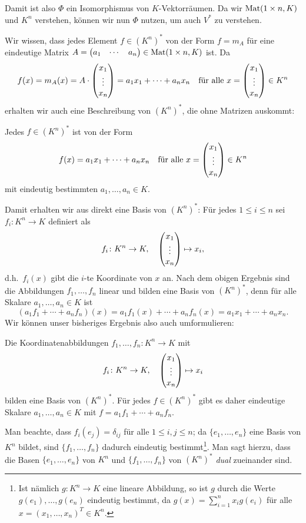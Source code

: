 \documentclass[a4paper,10pt]{article}
\begin{document}
Damit ist also $\Phi$ ein Isomorphismus von $K$-Vektorräumen. Da wir $\mathrm{Mat}(1 \times n, K)$ und $K^n$ verstehen, können wir nun $\Phi$ nutzen, um auch $V^*$ zu verstehen.

Wir wissen, dass jedes Element $f \in (K^n)^*$ von der Form $f = m_A$ für eine eindeutige Matrix $A = \begin{pmatrix} a_1 & \cdots & a_n \end{pmatrix} \in \mathrm{Mat}(1 \times n, K)$ ist. Da
\[
 f(x)
 = m_A(x)
 = A \cdot \begin{pmatrix} x_1 \\ \vdots \\ x_n \end{pmatrix}
 = a_1 x_1 + \dotsb + a_n x_n
 \quad
 \text{für alle $x = \begin{pmatrix} x_1 \\ \vdots \\ x_n \end{pmatrix} \in K^n$}
\]
erhalten wir auch eine Beschreibung von $(K^n)^*$, die ohne Matrizen auskommt:


\begin{shaded}
 Jedes $f \in (K^n)^*$ ist von der Form
 \[
  f(x) = a_1 x_1 + \dotsb + a_n x_n
  \quad
  \text{für alle $x = \begin{pmatrix} x_1 \\ \vdots \\ x_n \end{pmatrix} \in K^n$}
 \]
 mit eindeutig bestimmten $a_1, \dotsc, a_n \in K$.
\end{shaded}

Damit erhalten wir aus direkt eine Basis von $(K^n)^*$: Für jedes $1 \leq i \leq n$ sei $f_i \colon K^n \to K$ definiert als
\[
 f_i \colon K^n \to K, \quad \begin{pmatrix} x_1 \\ \vdots \\ x_n \end{pmatrix} \mapsto x_i,
\]
d.h.\ $f_i(x)$ gibt die $i$-te Koordinate von $x$ an. Nach dem obigen Ergebnis sind die Abbildungen $f_1, \dotsc, f_n$ linear und bilden eine Basis von $(K^n)^*$, denn für alle Skalare $a_1, \dotsc, a_n \in K$ ist
\[
 (a_1 f_1 + \dotsb + a_n f_n)(x)
 = a_1 f_1(x) + \dotsb + a_n f_n(x)
 = a_1 x_1 + \dotsb + a_n x_n.
\]
Wir können unser bisheriges Ergebnis also auch umformulieren:

\begin{shaded}
 Die Koordinatenabbildungen $f_1, \dotsc, f_n \colon K^n \to K$ mit
 \[
  f_i \colon K^n \to K, \quad \begin{pmatrix} x_1 \\ \vdots \\ x_n \end{pmatrix} \mapsto x_i
 \]
 bilden eine Basis von $(K^n)^*$. Für jedes $f \in (K^n)^*$ gibt es daher eindeutige Skalare $a_1, \dotsc, a_n \in K$ mit $f = a_1 f_1 + \dotsb + a_n f_n$.
\end{shaded}

Man beachte, dass $f_i(e_j) = \delta_{ij}$ für alle $1 \leq i,j \leq n$; da $\{e_1, \dotsc, e_n\}$ eine Basis von $K^n$ bildet, sind $\{f_1, \dotsc, f_n\}$ dadurch eindeutig bestimmt\footnote{Ist nämlich $g \colon K^n \to K$ eine lineare Abbildung, so ist $g$ durch die Werte $g(e_1), \dotsc, g(e_n)$ eindeutig bestimmt, da $g(x) = \sum_{i=1}^n x_i g(e_i)$ für alle $x = (x_1, \dotsc, x_n)^T \in K^n$.}.  Man sagt hierzu, dass die Basen $\{e_1, \dotsc, e_n\}$ von $K^n$ und $\{f_1, \dotsc, f_n\}$ von $(K^n)^*$ \emph{dual} zueinander sind.
\end{document}
